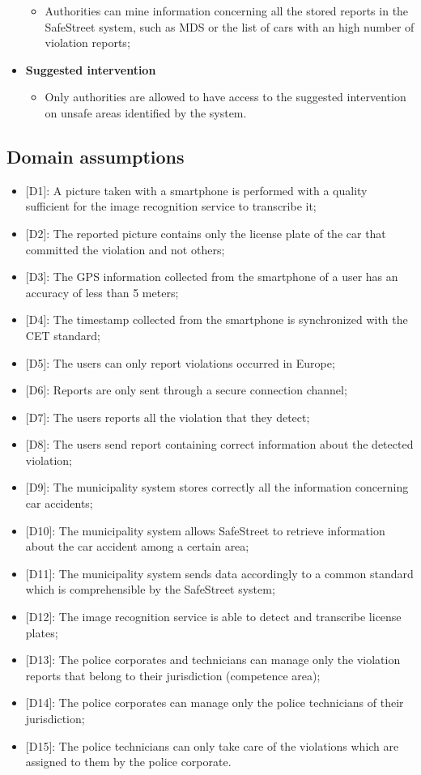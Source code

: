 \begin{itemize}
\begin{itemize}
            \item Authorities can mine information concerning all the stored reports in the SafeStreet system, such as MDS or the list of cars with an high number of violation reports;
        \end{itemize}
    \item \textbf{Suggested intervention}
        \begin{itemize}
            \item Only authorities are allowed to have access to the suggested intervention on unsafe areas identified by the system.
        \end{itemize}
    \end{itemize}
\subsection{Domain assumptions}
\begin{itemize}
    \item {[D1]}: A picture taken with a smartphone is performed with a quality sufficient for the image recognition service to transcribe it;
    \item {[D2]}: The reported picture contains only the license plate of the car that committed the violation and not others;
    \item {[D3]}: The GPS information collected from the smartphone of a user has an accuracy of less than 5 meters;
    \item {[D4]}: The timestamp collected from the smartphone is synchronized with the CET standard;
    \item {[D5]}: The users can only report violations occurred in Europe;
    \item {[D6]}: Reports are only sent through a secure connection channel;
    \item {[D7]}: The users reports all the violation that they detect;
    \item {[D8]}: The users send report containing correct information about the detected violation;
    \item {[D9]}: The municipality system stores correctly all the information concerning car accidents;
    \item {[D10]}: The municipality system allows SafeStreet to retrieve information about the car accident among a certain area;
    \item {[D11]}: The municipality system sends data accordingly to a common standard which is comprehensible by the SafeStreet system;
    \item {[D12]}: The image recognition service is able to detect and transcribe license plates;
    \item {[D13]}: The police corporates and technicians can manage only the violation reports that belong to their jurisdiction (competence area);
    \item {[D14]}: The police corporates can manage only the police technicians of their jurisdiction;
    \item {[D15]}: The police technicians can only take care of the violations which are assigned to them by the police corporate.
\end{itemize}
